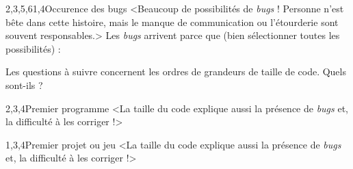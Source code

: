 \begin{quiz}[title={{\itshape Bugs} et bogues}]
\begin{quizquestion}[b]{2,3,5,6}{1,4}{Occurence des {\upshape bugs}}
<Beaucoup de possibilités de \textit{bugs} ! Personne n'est bête dans cette histoire, mais le manque de communication ou l'étourderie sont souvent responsables.>
Les \textit{bugs} arrivent parce que (bien sélectionner toutes les possibilités) :
\end{quizquestion}

Les questions à suivre concernent les ordres de grandeurs de taille de code. Quels sont-ils ?

\begin{quizquestion*}[b]{1}{2,3,4}{Premier programme}
<La taille du code explique aussi la présence de \textit{bugs} et, la difficulté à les corriger !>
\end{quizquestion*}


\begin{quizquestion*}[b]{2}{1,3,4}{Premier projet ou jeu}
<La taille du code explique aussi la présence de \textit{bugs} et, la difficulté à les corriger !>
\end{quizquestion*}


\end{quiz}
